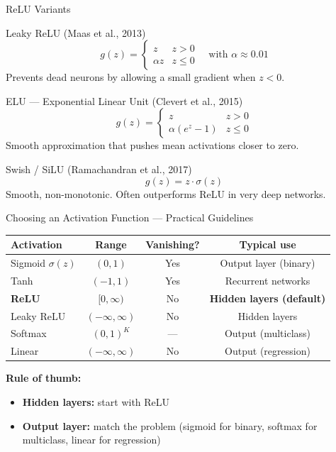 \documentclass[11pt,aspectratio=169,professionalfonts]{beamer}
\begin{document}
%
%
\begin{frame}{ReLU Variants}
\footnotesize
\begin{block}{Leaky ReLU (Maas et al., 2013)}
\[
g(z) = \begin{cases} z & z > 0 \\ \alpha z & z \leq 0 \end{cases}
\quad \text{with } \alpha \approx 0.01
\]
Prevents dead neurons by allowing a small gradient when $z < 0$.
\end{block}

\begin{block}{ELU --- Exponential Linear Unit (Clevert et al., 2015)}
\[
g(z) = \begin{cases} z & z > 0 \\ \alpha(e^z - 1) & z \leq 0 \end{cases}
\]
Smooth approximation that pushes mean activations closer to zero.
\end{block}

\begin{block}{Swish / SiLU (Ramachandran et al., 2017)}
\[
g(z) = z \cdot \sigma(z)
\]
Smooth, non-monotonic. Often outperforms ReLU in very deep networks.
\end{block}
\end{frame}
%
%
\begin{frame}{Choosing an Activation Function --- Practical Guidelines}

\begin{center}
\renewcommand{\arraystretch}{1.4}
\begin{tabular}{l c c c}
\hline
\textbf{Activation} & \textbf{Range} & \textbf{Vanishing?} & \textbf{Typical use} \\
\hline
Sigmoid $\sigma(z)$ & $(0,1)$ & Yes & Output layer (binary) \\
Tanh & $(-1,1)$ & Yes & Recurrent networks \\
\textbf{ReLU} & $[0,\infty)$ & No & \textbf{Hidden layers (default)} \\
Leaky ReLU & $(-\infty,\infty)$ & No & Hidden layers \\
Softmax & $(0,1)^K$ & --- & Output (multiclass) \\
Linear & $(-\infty,\infty)$ & No & Output (regression) \\
\hline
\end{tabular}
\end{center}

\vspace{0.3cm}
\footnotesize
\textbf{Rule of thumb:}
\begin{itemize}
    \item \textbf{Hidden layers:} start with ReLU
    \item \textbf{Output layer:} match the problem (sigmoid for binary, softmax for multiclass, linear for regression)
\end{itemize}
\end{frame}
%
\end{document}
